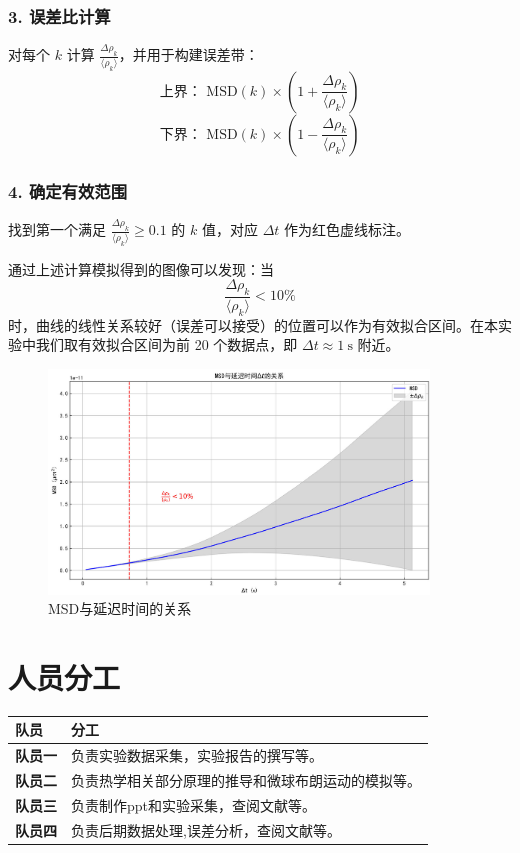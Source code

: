 \documentclass[a4paper]{report} %
\begin{document}
\subsubsection*{3. 误差比计算}

对每个 $k$ 计算 $\frac{\Delta \rho_k}{\langle \rho_k \rangle}$，并用于构建误差带：
\[
\text{上界： } \text{MSD}(k) \times \left(1 + \frac{\Delta \rho_k}{\langle \rho_k \rangle}\right)
\]
\[
\text{下界： } \text{MSD}(k) \times \left(1 - \frac{\Delta \rho_k}{\langle \rho_k \rangle}\right)
\]

\subsubsection*{4. 确定有效范围}

找到第一个满足 $\frac{\Delta \rho_k}{\langle \rho_k \rangle} \geq 0.1$ 的 $k$ 值，对应 $\Delta t$ 作为红色虚线标注。

通过上述计算模拟得到的图像可以发现：当 
\[
\frac{\Delta \rho_k}{\langle \rho_k \rangle} < 10\%
\]
时，曲线的线性关系较好（误差可以接受）的位置可以作为有效拟合区间。在本实验中我们取有效拟合区间为前 20 个数据点，即 $\Delta t \approx 1 \ \text{s}$ 附近。

\begin{figure}[H]
    \centering
    \includegraphics[width=0.9\textwidth]{取1.jpg}
    \caption{MSD与延迟时间的关系}
    \label{fig:let1}
\end{figure}

\section{人员分工}
\renewcommand{\arraystretch}{1.3} %

\begin{tabularx}{\textwidth}{>{\bfseries}l X}
\toprule
队员 & 分工 \\
\midrule
队员一 & 负责实验数据采集，实验报告的撰写等。 \\
队员二 & 负责热学相关部分原理的推导和微球布朗运动的模拟等。 \\
队员三 & 负责制作ppt和实验采集，查阅文献等。 \\
队员四 & 负责后期数据处理,误差分析，查阅文献等。 \\
\bottomrule
\end{tabularx}
\end{document}
